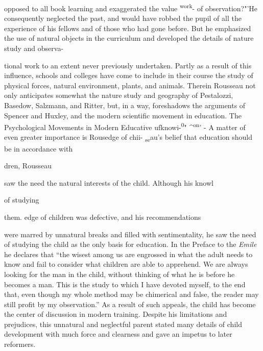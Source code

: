 \documentclass[
]{book}
\begin{document}
opposed to all book learning and exaggerated the value \textsuperscript{work}- of observation?"'He consequently neglected the past, and would have robbed the pupil of all the experience of his fellows and of those who had gone before. But he emphasized the use of natural objects in the curriculum and developed the details of nature study and observa-

tional work to an extent never previously undertaken. Partly as a result of this influence, schools and colleges have come to include in their course the study of physical forces, natural environment, plants, and animals. Therein Rousseau not only anticipates somewhat the nature study and geography of Pestalozzi, Basedow, Salzmann, and Ritter, but, in a way, foreshadows the arguments of Spencer and Huxley, and the modern scientific movement in education. The Psychological Movements in Modern Educative ufknowi-\textsuperscript{0}" \^{}\textsuperscript{on}' - A matter of even greater importance is Rousedge of chii- \textsubscript{se}au's belief that education should be in accordance with

dren, Rousseau

saw the need the natural interests of the child. Although his knowl

of studying

them. edge of children was defective, and his recommendations

were marred by unnatural breaks and filled with sentimentality, he saw the need of studying the child as the only basis for education. In the Preface to the \emph{Emile} he declares that ``the wisest among us are engrossed in what the adult needs to know and fail to consider what children are able to apprehend. We are always looking for the man in the child, without thinking of what he is before he becomes a man. This is the study to which I have devoted myself, to the end that, even though my whole method may be chimerical and false, the reader may still profit by my observation.'' As a result of such appeals, the child has become the center of discussion in modern training. Despite his limitations and prejudices, this unnatural and neglectful parent stated many details of child development with much force and clearness and gave an impetus to later reformers.
\end{document}
